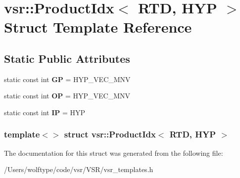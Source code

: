 \hypertarget{structvsr_1_1_product_idx_3_01_r_t_d_00_01_h_y_p_01_4}{\section{vsr\-:\-:Product\-Idx$<$ R\-T\-D, H\-Y\-P $>$ Struct Template Reference}
\label{structvsr_1_1_product_idx_3_01_r_t_d_00_01_h_y_p_01_4}
}
\subsection*{Static Public Attributes}
\begin{DoxyCompactItemize}
\item 
\hypertarget{structvsr_1_1_product_idx_3_01_r_t_d_00_01_h_y_p_01_4_a31d489ce5667742801d60c30f3abbf19}{static const int {\bfseries G\-P} = H\-Y\-P\-\_\-\-V\-E\-C\-\_\-\-M\-N\-V}\label{structvsr_1_1_product_idx_3_01_r_t_d_00_01_h_y_p_01_4_a31d489ce5667742801d60c30f3abbf19}

\item 
\hypertarget{structvsr_1_1_product_idx_3_01_r_t_d_00_01_h_y_p_01_4_a91c9dac74a226c84d2f07adf9168973e}{static const int {\bfseries O\-P} = H\-Y\-P\-\_\-\-V\-E\-C\-\_\-\-M\-N\-V}\label{structvsr_1_1_product_idx_3_01_r_t_d_00_01_h_y_p_01_4_a91c9dac74a226c84d2f07adf9168973e}

\item 
\hypertarget{structvsr_1_1_product_idx_3_01_r_t_d_00_01_h_y_p_01_4_a9bc1a9bc751b07042cac6745b643dad1}{static const int {\bfseries I\-P} = H\-Y\-P}\label{structvsr_1_1_product_idx_3_01_r_t_d_00_01_h_y_p_01_4_a9bc1a9bc751b07042cac6745b643dad1}

\end{DoxyCompactItemize}
\subsubsection*{template$<$$>$ struct vsr\-::\-Product\-Idx$<$ R\-T\-D, H\-Y\-P $>$}



The documentation for this struct was generated from the following file\-:\begin{DoxyCompactItemize}
\item 
/\-Users/wolftype/code/vsr/\-V\-S\-R/vsr\-\_\-templates.\-h\end{DoxyCompactItemize}
